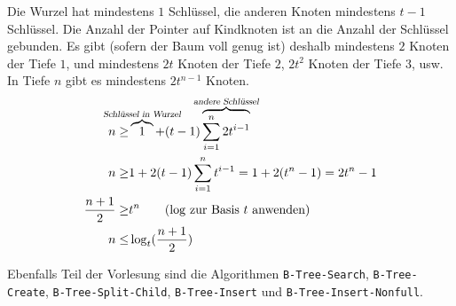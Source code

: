 \begin{beweis}
    Die Wurzel hat mindestens $1$ Schlüssel, die anderen Knoten mindestens
    $t-1$ Schlüssel. Die Anzahl der Pointer auf Kindknoten ist an die Anzahl
    der Schlüssel gebunden. Es gibt (sofern der Baum voll genug ist) deshalb
    mindestens $2$ Knoten der Tiefe $1$, und mindestens $2t$ Knoten der Tiefe
    $2$, $2t^2$ Knoten der Tiefe 3, usw. In Tiefe $n$ gibt es mindestens
    $2t^{n-1}$ Knoten. 
    \begin{align}
        n \geq& \overbrace{1}^{\mathclap{\textsl{Schlüssel in Wurzel}}} + (t-1)
        \overbrace{\sum_{i=1}^n 2t^{i-1}}^{\mathclap{\textsl{andere
        Schlüssel}}} \\
        n \geq& 1+2(t-1) \sum_{i=1}^n t^{i-1} = 1+2(t^n-1) = 2t^n-1 \\
        \frac{n+1}{2} \geq& t^n \qquad \text{($\log$ zur Basis $t$ anwenden)}  \\
        n \leq& \log_t(\frac{n+1}{2})
    \end{align}
\end{beweis}


\begin{bemerkung}
    Ebenfalls Teil der Vorlesung sind die Algorithmen \verb+B-Tree-Search+,
    \verb+B-Tree-Create+, \verb+B-Tree-Split-Child+, \verb+B-Tree-Insert+ und
    \verb+B-Tree-Insert-Nonfull+.
\end{bemerkung}
